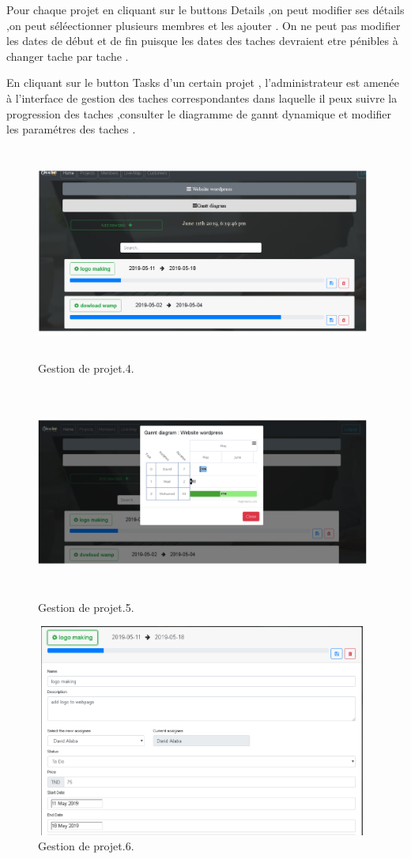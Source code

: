 Pour chaque projet en cliquant sur le buttons Details ,on peut modifier ses
d\'{e}tails ,on peut s\'{e}l\'{e}ectionner plusieurs membres et les ajouter .
On ne peut pas modifier les dates de d\'{e}but et de fin puisque les dates des
taches devraient etre p\'{e}nibles \`{a} changer tache par tache .

\bigskip
\bigskip

En cliquant sur le button \guillemotleft{} Tasks \guillemotright{} d'un certain projet , l'administrateur est
amen\'{e}e \`{a} l'interface de gestion des taches correspondantes dans laquelle il
peux suivre la progression des taches ,consulter le diagramme de gannt
dynamique et modifier les param\'{e}tres des taches .

\FloatBarrier
\begin{figure}[H]
\center
\includegraphics[width=11cm,height=7cm]{./figures/pres/gp4.png}
\caption{Gestion de projet.4.}
\end{figure}
\FloatBarrier



\FloatBarrier
\begin{figure}[H]
\center
\includegraphics[width=11cm,height=7cm]{./figures/pres/gp5.png}
\caption{Gestion de projet.5.}
\end{figure}
\FloatBarrier


\FloatBarrier
\begin{figure}[H]
\center
\includegraphics[width=11cm,height=7cm]{./figures/pres/gp6.png}
\caption{Gestion de projet.6.}
\end{figure}
\FloatBarrier 